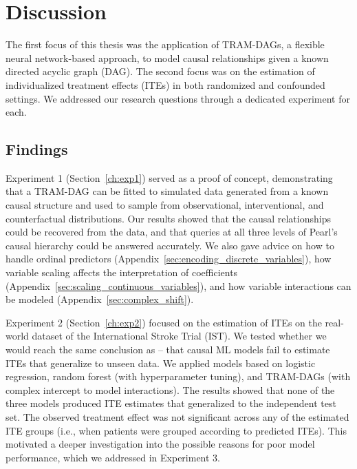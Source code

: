 



\chapter{Discussion}

The first focus of this thesis was the application of TRAM-DAGs, a flexible neural network-based approach, to model causal relationships given a known directed acyclic graph (DAG). The second focus was on the estimation of individualized treatment effects (ITEs) in both randomized and confounded settings. We addressed our research questions through a dedicated experiment for each.

\section{Findings}

\medskip

Experiment 1 (Section~\ref{ch:exp1}) served as a proof of concept, demonstrating that a TRAM-DAG can be fitted to simulated data generated from a known causal structure and used to sample from observational, interventional, and counterfactual distributions. Our results showed that the causal relationships could be recovered from the data, and that queries at all three levels of Pearl's causal hierarchy could be answered accurately. We also gave advice on how to handle ordinal predictors (Appendix~\ref{sec:encoding_discrete_variables}), how variable scaling affects the interpretation of coefficients (Appendix~\ref{sec:scaling_continuous_variables}), and how variable interactions can be modeled (Appendix~\ref{sec:complex_shift}).

\medskip

Experiment 2 (Section~\ref{ch:exp2}) focused on the estimation of ITEs on the real-world dataset of the International Stroke Trial (IST). We tested whether we would reach the same conclusion as \citet{chen2025} -- that causal ML models fail to estimate ITEs that generalize to unseen data. We applied models based on logistic regression, random forest (with hyperparameter tuning), and TRAM-DAGs (with complex intercept to model interactions). The results showed that none of the three models produced ITE estimates that generalized to the independent test set. The observed treatment effect was not significant across any of the estimated ITE groups (i.e., when patients were grouped according to predicted ITEs). This motivated a deeper investigation into the possible reasons for poor model performance, which we addressed in Experiment 3.

